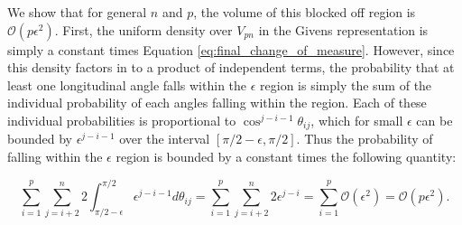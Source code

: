 \documentclass[ba]{imsart}
\numberwithin{equation}{section}
\theoremstyle{plain}
\begin{document}


\noindent We show that for general $n$ and $p$, the volume of this blocked off region is $\mathcal{O}(p \epsilon^2)$. First, the uniform density over $V_{pn}$ in the Givens representation is simply a constant times Equation \ref{eq:final_change_of_measure}. However, since this density factors in to a product of independent terms, the probability that at least one longitudinal angle falls within the $\epsilon$ region is simply the sum of the individual probability of each angles falling within the region. Each of these individual probabilities is proportional to $\cos^{j-i-1} \theta_{ij}$, which for small $\epsilon$ can be bounded by $\epsilon^{j-i-1}$ over the interval $[\pi/2 - \epsilon, \pi/2]$. Thus the probability of falling within the $\epsilon$ region is bounded by a constant times the following quantity:

\begin{equation}
\label{eq:bound_on_epsilon_vol}
\sum_{i=1}^p \sum_{j=i+2}^n 2 \int_{\pi/2-\epsilon}^{\pi/2} \epsilon^{j-i-1} d\theta_{ij} = \sum_{i=1}^p \sum_{j=i+2}^n 2 \epsilon^{j-i} = \sum_{i=1}^p \mathcal{O}(\epsilon^2) = \mathcal{O}(p \epsilon^2).
\end{equation}
\end{document}
